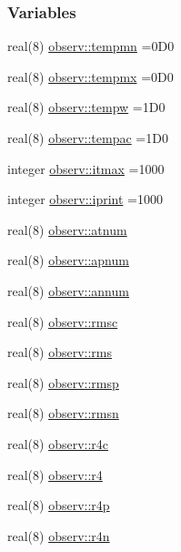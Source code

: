 \subsubsection*{Variables}
\begin{DoxyCompactItemize}
\item 
real(8) \hyperlink{namespaceobserv_a992f70652154733395ffdab398549239}{observ\+::tempmn} =0\+D0
\item 
real(8) \hyperlink{namespaceobserv_a389e94f4d08c345cc37906dc48289a9d}{observ\+::tempmx} =0\+D0
\item 
real(8) \hyperlink{namespaceobserv_a844b0f466d0870c37fd460723a96f21c}{observ\+::tempw} =1\+D0
\item 
real(8) \hyperlink{namespaceobserv_a70b4ab331c460ccbbad144d552722744}{observ\+::tempac} =1\+D0
\item 
integer \hyperlink{namespaceobserv_a1c1ca20926be13c61016d6ee42c77212}{observ\+::itmax} =1000
\item 
integer \hyperlink{namespaceobserv_ad0ee4417f363898a68c79a49c0de9280}{observ\+::iprint} =1000
\item 
real(8) \hyperlink{namespaceobserv_a23f826df2cae1039589aced00fb7939b}{observ\+::atnum}
\item 
real(8) \hyperlink{namespaceobserv_a1342a598cec837c98c3e43012a6826fe}{observ\+::apnum}
\item 
real(8) \hyperlink{namespaceobserv_a97c7906f826d0a44d6a25a22fa51ba89}{observ\+::annum}
\item 
real(8) \hyperlink{namespaceobserv_a69b58be5538a0df79b7663fe1be07b10}{observ\+::rmsc}
\item 
real(8) \hyperlink{namespaceobserv_a3b3964ead731eed696585a43d22b51f6}{observ\+::rms}
\item 
real(8) \hyperlink{namespaceobserv_a16ce4982fb88de7727f5d9e0fc731ad7}{observ\+::rmsp}
\item 
real(8) \hyperlink{namespaceobserv_aa3dc1d3aead73ec11f1d86f5a069d302}{observ\+::rmsn}
\item 
real(8) \hyperlink{namespaceobserv_a40affdee9346fd5b62a32dff19025a59}{observ\+::r4c}
\item 
real(8) \hyperlink{namespaceobserv_a763f74159ece0956ce250073d231cee7}{observ\+::r4}
\item 
real(8) \hyperlink{namespaceobserv_a923afbf28dd2bf131da354abbb1eb785}{observ\+::r4p}
\item 
real(8) \hyperlink{namespaceobserv_a6e698cb41249db67aa98431cf2b5a4cd}{observ\+::r4n}
\item 

\end{DoxyCompactItemize}
